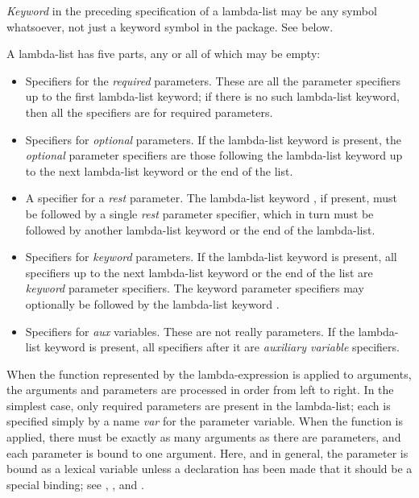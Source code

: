 \emph{Keyword} in the preceding specification of a lambda-list
may be any symbol whatsoever, not just a keyword symbol
in the  package.  See below.

A lambda-list has five parts, any or all of which may be empty:

\begin{itemize}
\item
Specifiers for the \emph{required} parameters.  These are all the parameter
specifiers up to the first lambda-list keyword; if there is no such
lambda-list keyword, then all the specifiers are for required parameters.

\item
Specifiers for \emph{optional} parameters.
If the lambda-list keyword  is present,
the \emph{optional} parameter specifiers are those following the
lambda-list keyword  up to the next lambda-list keyword or the
end of the list.

\item
A specifier for a \emph{rest} parameter.  The lambda-list keyword , if present, must
be followed by a single \emph{rest} parameter specifier,
which in turn must be followed by another lambda-list keyword or the end
of the lambda-list.

\item
Specifiers for \emph{keyword} parameters.
If the lambda-list keyword  is present, all specifiers up to the next lambda-list keyword
or the end of the list are \emph{keyword} parameter specifiers.
The keyword parameter specifiers may optionally be followed by the
lambda-list keyword .

\item
Specifiers for \emph{aux} variables.  These are not really parameters.
If the lambda-list keyword  is present, all specifiers after it are
\emph{auxiliary variable} specifiers.
\end{itemize}

When the function represented by the lambda-expression is applied
to arguments, the arguments and parameters are processed in order
from left to right.
In the simplest case, only required parameters are present
in the lambda-list; each is specified simply by a name \emph{var} for
the parameter variable.
When the function is applied,
there must be exactly as many arguments as there are parameters,
and each parameter is bound to one argument.  Here, and in general,
the parameter is bound as a lexical variable unless a
declaration has been made that it should be a special binding;
see , , and .

